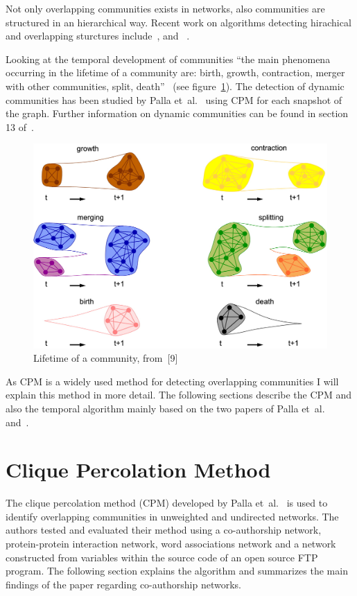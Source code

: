 \documentclass[runningheads,a4paper]{llncs}
\begin{document}
Not only overlapping communities exists in networks, also communities are structured in an hierarchical way.
Recent work on algorithms detecting hirachical and overlapping sturctures  include~\cite{1367-2630-11-3-033015}, \cite{Cui201485} and~ \cite{Shen20091706}.

Looking at the temporal development of communities ``the main phenomena occurring in the lifetime of a community are: birth, growth, contraction, merger with other communities, split, death''~\cite{fortunato2010community} (see figure~\ref{fig:evolution}).
The detection of dynamic communities has been studied by Palla et~al.~\cite{palla2007quantifying} using CPM for each snapshot of the graph. Further information on dynamic communities can be found in section 13 of~\cite{fortunato2010community}.

\begin{figure}
	\includegraphics[width=\textwidth]{img/fullSizeEvolution.jpg}
	\caption{Lifetime of a community, from~[9]}
	\label{fig:evolution}
\end{figure}

As CPM is a widely used method for detecting overlapping communities I will explain this method in more detail. The following sections describe the CPM and also the temporal algorithm mainly based on the two papers of Palla et~al.~\cite{palla2005uncovering} and~\cite{palla2007quantifying}.

\section{Clique Percolation Method}
\label{cpm}
The clique percolation method (CPM) developed by Palla et~al.~\cite{palla2007quantifying} is used to identify overlapping communities in unweighted and undirected networks.
The authors tested and evaluated their method using a co-authorship network, protein-protein interaction network, word associations network and a network constructed from variables within the source code of an open source FTP program.
The following section explains the algorithm and summarizes the main findings of the paper regarding co-authorship networks.
\end{document}
